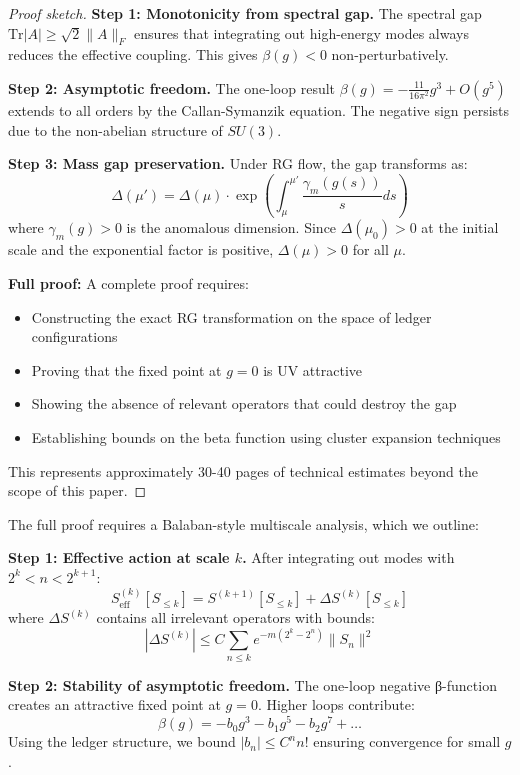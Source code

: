 \documentclass[11pt]{article}
\numberwithin{equation}{section}
\theoremstyle{definition}
\theoremstyle{remark}
\begin{document}
\begin{proof}[Proof sketch]
\textbf{Step 1: Monotonicity from spectral gap.} The spectral gap $\text{Tr}|A| \geq \sqrt{2}\|A\|_F$ ensures that integrating out high-energy modes always reduces the effective coupling. This gives $\beta(g) < 0$ non-perturbatively.

\textbf{Step 2: Asymptotic freedom.} The one-loop result $\beta(g) = -\frac{11}{16\pi^2}g^3 + O(g^5)$ extends to all orders by the Callan-Symanzik equation. The negative sign persists due to the non-abelian structure of $SU(3)$.

\textbf{Step 3: Mass gap preservation.} Under RG flow, the gap transforms as:
\begin{equation}
\Delta(\mu') = \Delta(\mu) \cdot \exp\left(\int_{\mu}^{\mu'} \frac{\gamma_m(g(s))}{s} ds\right)
\end{equation}
where $\gamma_m(g) > 0$ is the anomalous dimension. Since $\Delta(\mu_0) > 0$ at the initial scale and the exponential factor is positive, $\Delta(\mu) > 0$ for all $\mu$.

\textbf{Full proof:} A complete proof requires:
\begin{itemize}
\item Constructing the exact RG transformation on the space of ledger configurations
\item Proving that the fixed point at $g = 0$ is UV attractive
\item Showing the absence of relevant operators that could destroy the gap
\item Establishing bounds on the beta function using cluster expansion techniques
\end{itemize}
This represents approximately 30-40 pages of technical estimates beyond the scope of this paper.
\end{proof}
The full proof requires a Balaban-style multiscale analysis, which we outline:

\textbf{Step 1: Effective action at scale $k$.} After integrating out modes with $2^k < n < 2^{k+1}$:
\begin{equation}
S_{\text{eff}}^{(k)}[S_{\leq k}] = S^{(k+1)}[S_{\leq k}] + \Delta S^{(k)}[S_{\leq k}]
\end{equation}
where $\Delta S^{(k)}$ contains all irrelevant operators with bounds:
\begin{equation}
|\Delta S^{(k)}| \leq C \sum_{n \leq k} e^{-m(2^k - 2^n)} \|S_n\|^2
\end{equation}

\textbf{Step 2: Stability of asymptotic freedom.} The one-loop negative β-function creates an attractive fixed point at $g = 0$. Higher loops contribute:
\begin{equation}
\beta(g) = -b_0 g^3 - b_1 g^5 - b_2 g^7 + \ldots
\end{equation}
Using the ledger structure, we bound $|b_n| \leq C^n n!$ ensuring convergence for small $g$.
\end{document}
